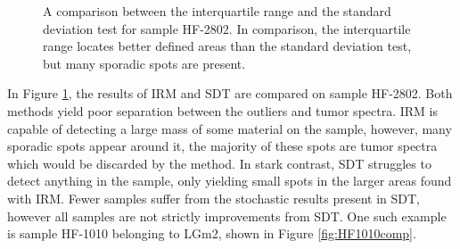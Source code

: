 \begin{figure}[h]

    \centering
    \qquad
    \caption{A comparison between the interquartile range and the standard deviation test for sample HF-2802. In comparison, the interquartile range locates better defined areas than the standard deviation test, but many sporadic spots are present.
\label{fig:HF2802comp}}%
\end{figure}
 

In Figure \ref{fig:HF2802comp}, the results of IRM and SDT are compared on sample HF-2802. Both methods yield poor separation between the outliers and tumor spectra. IRM is capable of detecting a large mass of some material on the sample, however, many sporadic spots appear around it, the majority of these spots are tumor spectra which would be discarded by the method. In stark contrast, SDT struggles to detect anything in the sample, only yielding small spots in the larger areas found with IRM.
Fewer samples suffer from the stochastic results present in SDT, however all samples are not strictly improvements from SDT. One such example is sample HF-1010 belonging to LGm2, shown in Figure \ref{fig:HF1010comp}.

